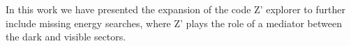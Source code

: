 In this work we have presented the expansion of the code Z' explorer to further include missing energy searches, where Z' plays the role of a mediator between the dark and visible sectors. 

